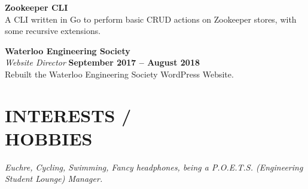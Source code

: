 \documentclass[margin,line]{resume}
\begin{document}
\begin{resume}
    \vspace{1.5mm}
    \textbf{\listing Zookeeper CLI} \vspace{1mm}\\%
    A CLI written in Go to perform basic CRUD actions on Zookeeper stores, with some recursive extensions.

    \vspace{1mm}
    \textbf{\listing Waterloo Engineering Society} \vspace{2mm}\\%
    \textsl{Website Director} \hfill \textbf{September 2017 -- August 2018}\\
    Rebuilt the Waterloo Engineering Society WordPress Website.

\sectionline

    \section{\mysidestyle \textbf{\large{I}\small{NTERESTS  / \\ \large{H}\small{OBBIES}}}}

    \textsl{Euchre, Cycling, Swimming, Fancy headphones, being a P.O.E.T.S. (Engineering Student Lounge) Manager.}\\

\end{resume}
\end{document}
